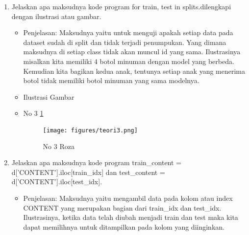 \begin{enumerate}
\item Jelaskan apa maksudnya kode program for train, test in splits.dilengkapi dengan ilustrasi atau gambar.
\begin{itemize}
\item Penjelasan: Maksudnya yaitu untuk menguji apakah setiap data pada dataset sudah di split dan tidak terjadi penumpukan. Yang dimana maksudnya di setiap class tidak akan muncul id yang sama. Ilustrasinya misalkan kita memiliki 4 botol minuman dengan model yang berbeda. Kemudian kita bagikan kedua anak, tentunya setiap anak yang menerima botol tidak memiliki botol minuman  yang sama modelnya.
\par 
\par
\item Ilustrasi Gambar
\item No 3  \ref{teori3}
\begin{figure}[!hbtp]
\centering
\texttt{[image: figures/teori3.png]}
\caption{No 3 Roza}
\label{teori3}
\end{figure}
\par
\end{itemize}
\par
\par

\item Jelaskan apa maksudnya kode program {train\_content = d['CONTENT'].iloc[train\_idx]} dan {test\_content = d['CONTENT'].iloc[test\_idx]}.
\begin{itemize}
\item Penjelasan: Maksudnya yaitu mengambil data pada kolom atau index CONTENT yang merupakan bagian dari train\_idx dan test\_idx. Ilustrasinya, ketika data telah diubah menjadi train dan test maka kita dapat memilihnya untuk ditampilkan pada kolom yang diinginkan.
\par 
\par
\end{itemize}
\par
\par


\end{enumerate}
